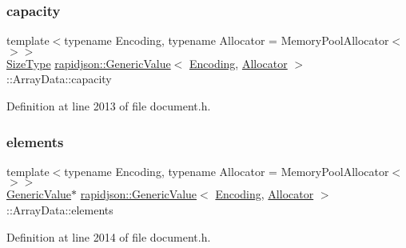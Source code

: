 \subsubsection{\texorpdfstring{capacity}{capacity}}
{\footnotesize\ttfamily template$<$typename Encoding, typename Allocator = Memory\+Pool\+Allocator$<$$>$$>$ \\
\mbox{\hyperlink{namespacerapidjson_a44eb33eaa523e36d466b1ced64b85c84}{Size\+Type}} \mbox{\hyperlink{classrapidjson_1_1_generic_value}{rapidjson\+::\+Generic\+Value}}$<$ \mbox{\hyperlink{classrapidjson_1_1_encoding}{Encoding}}, \mbox{\hyperlink{classrapidjson_1_1_allocator}{Allocator}} $>$\+::Array\+Data\+::capacity}



Definition at line 2013 of file document.\+h.

\mbox{\label{structrapidjson_1_1_generic_value_1_1_array_data_a01391819fc813854b808391933be424d}} 
\subsubsection{\texorpdfstring{elements}{elements}}
{\footnotesize\ttfamily template$<$typename Encoding, typename Allocator = Memory\+Pool\+Allocator$<$$>$$>$ \\
\mbox{\hyperlink{classrapidjson_1_1_generic_value}{Generic\+Value}}$\ast$ \mbox{\hyperlink{classrapidjson_1_1_generic_value}{rapidjson\+::\+Generic\+Value}}$<$ \mbox{\hyperlink{classrapidjson_1_1_encoding}{Encoding}}, \mbox{\hyperlink{classrapidjson_1_1_allocator}{Allocator}} $>$\+::Array\+Data\+::elements}



Definition at line 2014 of file document.\+h.

\mbox{\label{structrapidjson_1_1_generic_value_1_1_array_data_a86f04ea890c25b448dc577ec6fe1e737}} 
